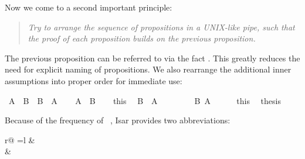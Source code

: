 \begin{isabellebody}
%
\begin{isamarkuptext}%
Now we come to a second important principle:
\begin{quote}\em
Try to arrange the sequence of propositions in a UNIX-like pipe,
such that the proof of each proposition builds on the previous proposition.
\end{quote}
The previous proposition can be referred to via the fact .
This greatly reduces the need for explicit naming of propositions.  We also
rearrange the additional inner assumptions into proper order for immediate use:%
\end{isamarkuptext}%
\isamarkuptrue%
\isamarkupfalse%
\ {}A\ {}\ B\ {}\ B\ {}\ A{}\isanewline
%
\isadelimproof
%
\endisadelimproof
%
\isatagproof
{}\isamarkupfalse%
\isanewline
\ \ \isamarkupfalse%
\ {}A\ {}\ B{}\isanewline
\ \ \isamarkupfalse%
\ this\ \isamarkupfalse%
\ {}B\ {}\ A{}\isanewline
\ \ \isamarkupfalse%
\isanewline
\ \ \ \ \isamarkupfalse%
\ {}B{}\ {}A{}\isanewline
\ \ \ \ \isamarkupfalse%
\ this\ \isamarkupfalse%
\ {}thesis\ \isamarkupfalse%
\isanewline
\ \ \isamarkupfalse%
\isanewline
{}\isamarkupfalse%
%
\endisatagproof
{\isafoldproof}%
%
\isadelimproof
%
\endisadelimproof
%
\begin{isamarkuptext}%
\noindent Because of the frequency of ~, Isar provides two abbreviations:
\begin{center}
\begin{tabular}{r@ {\quad=\quad}l}
 &   \\
 &  
\end{tabular}
\end{center}


\end{isamarkuptext}
\end{isabellebody}

